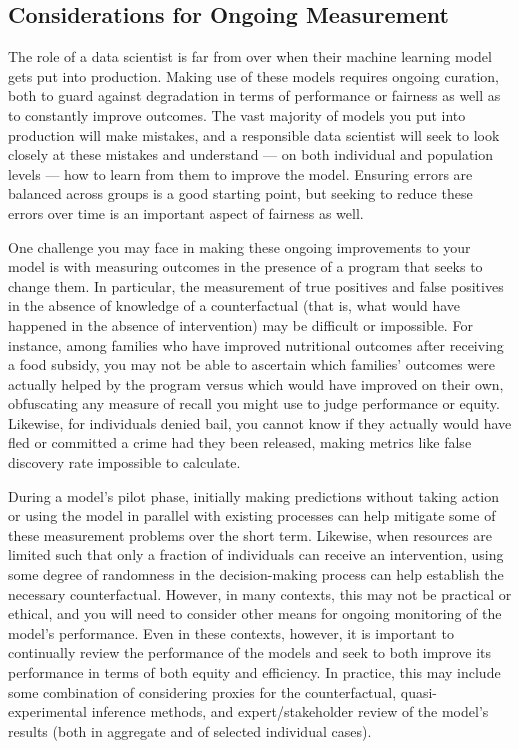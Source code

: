 \documentclass[]{krantz}
\begin{document}
\subsection{Considerations for Ongoing
Measurement}\label{considerations-for-ongoing-measurement}

The role of a data scientist is far from over when their machine
learning model gets put into production. Making use of these models
requires ongoing curation, both to guard against degradation in terms of
performance or fairness as well as to constantly improve outcomes. The
vast majority of models you put into production will make mistakes, and
a responsible data scientist will seek to look closely at these mistakes
and understand --- on both individual and population levels --- how to
learn from them to improve the model. Ensuring errors are balanced
across groups is a good starting point, but seeking to reduce these
errors over time is an important aspect of fairness as well.

One challenge you may face in making these ongoing improvements to your
model is with measuring outcomes in the presence of a program that seeks
to change them. In particular, the measurement of true positives and
false positives in the absence of knowledge of a counterfactual (that
is, what would have happened in the absence of intervention) may be
difficult or impossible. For instance, among families who have improved
nutritional outcomes after receiving a food subsidy, you may not be able
to ascertain which families' outcomes were actually helped by the
program versus which would have improved on their own, obfuscating any
measure of recall you might use to judge performance or equity.
Likewise, for individuals denied bail, you cannot know if they actually
would have fled or committed a crime had they been released, making
metrics like false discovery rate impossible to calculate.

During a model's pilot phase, initially making predictions without
taking action or using the model in parallel with existing processes can
help mitigate some of these measurement problems over the short term.
Likewise, when resources are limited such that only a fraction of
individuals can receive an intervention, using some degree of randomness
in the decision-making process can help establish the necessary
counterfactual. However, in many contexts, this may not be practical or
ethical, and you will need to consider other means for ongoing
monitoring of the model's performance. Even in these contexts, however,
it is important to continually review the performance of the models and
seek to both improve its performance in terms of both equity and
efficiency. In practice, this may include some combination of
considering proxies for the counterfactual, quasi-experimental inference
methods, and expert/stakeholder review of the model's results (both in
aggregate and of selected individual cases).
\end{document}
